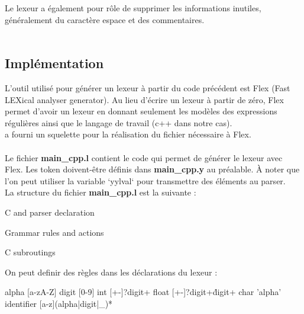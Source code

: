 \documentclass[a4paper]{article}%
\begin{document}
Le lexeur a également pour rôle de supprimer les informations inutiles, généralement du caractère espace et des commentaires.\\~\\


\subsection{Implémentation}

L'outil utilisé pour générer un lexeur à partir du code précédent est Flex (Fast LEXical analyser generator). Au lieu d'écrire un lexeur à partir de zéro, Flex permet d'avoir un lexeur en donnant seulement les modèles des expressions régulières ainsi que le langage de travail (c++ dans notre cas).\\
\cite{compilerFlexBison} a fourni un squelette pour la réalisation du fichier nécessaire à Flex.\\~\\
\noindent
Le fichier \textbf{main\_cpp.l} contient le code qui permet de générer le lexeur avec Flex. Les token doivent-être définis dans \textbf{main\_cpp.y} au préalable.
À noter que l'on peut utiliser la variable `yylval` pour transmettre des
éléments au parser.\\

La structure du fichier \textbf{main\_cpp.l} est la suivante :

\begin{code}
C and parser declaration

Grammar rules and actions

C subroutings
\end{code}\leavevmode\newline


\noindent
On peut definir des règles dans les déclarations du lexeur :

\begin{code}

alpha [a-zA-Z]
digit [0-9]
int [+-]?{digit}+
float [+-]?{digit}+\.{digit}+
char '{alpha}'
identifier [a-z]({alpha}|{digit}|_)*
\end{code}\leavevmode\newline
\end{document}

